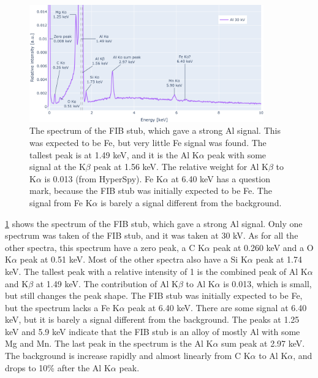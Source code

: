 \begin{figure}[h!]
    \centering
    \includegraphics[width=0.90\textwidth]{figures/each_spectra_not_on_github/Al_everything.png}
    \caption{
        The spectrum of the FIB stub, which gave a strong Al signal.
        This was expected to be Fe, but very little Fe signal was found.
        The tallest peak is at 1.49 keV, and it is the Al K$\alpha$ peak with some signal at the K$\beta$ peak at 1.56 keV.
        The relative weight for Al K$\beta$ to K$\alpha$ is 0.013 (from HyperSpy).
        Fe K$\alpha$ at 6.40 keV has a question mark, because the FIB stub was initially expected to be Fe.
        The signal from Fe K$\alpha$ is barely a signal different from the background.
    }
    \label{fig:results:Spectra_Al}
\end{figure}

\cref{fig:results:Spectra_Al} shows the spectrum of the FIB stub, which gave a strong Al signal.
Only one spectrum was taken of the FIB stub, and it was taken at 30 kV.
As for all the other spectra, this spectrum have a zero peak, a C K$\alpha$ peak at 0.260 keV and a O K$\alpha$ peak at 0.51 keV.
Most of the other spectra also have a Si K$\alpha$ peak at 1.74 keV.
The tallest peak with a relative intensity of 1 is the combined peak of Al K$\alpha$ and K$\beta$ at 1.49 keV.
The contribution of Al K$\beta$ to Al K$\alpha$ is 0.013, which is small, but still changes the peak shape.
The FIB stub was initially expected to be Fe, but the spectrum lacks a Fe K$\alpha$ peak at 6.40 keV.
There are some signal at 6.40 keV, but it is barely a signal different from the background.
The peaks at 1.25 keV and 5.9 keV indicate that the FIB stub is an alloy of mostly Al with some Mg and Mn.
The last peak in the spectrum is the Al K$\alpha$ sum peak at 2.97 keV. %
The background is increase rapidly and almost linearly from C K$\alpha$ to Al K$\alpha$, and drops to 10\% after the Al K$\alpha$ peak.



